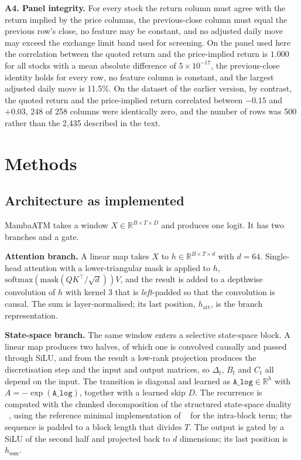 \documentclass[pdflatex,sn-mathphys-ay]{sn-jnl}
\theoremstyle{thmstyleone}%
\theoremstyle{thmstyletwo}%
\theoremstyle{thmstyletwo}%
\begin{document}
\textbf{A4. Panel integrity.} For every stock the return column must agree with the return implied
by the price columns, the previous-close column must equal the previous row's close, no feature may
be constant, and no adjusted daily move may exceed the exchange limit band used for screening. On
the panel used here the correlation between the quoted return and the price-implied return is
$1.000$ for all \nStocks{} stocks with a mean absolute difference of $5\times10^{-17}$, the
previous-close identity holds for every row, no feature column is constant, and the largest adjusted
daily move is 11.5\%. On the dataset of the earlier version, by contrast, the quoted return and the
price-implied return correlated between $-0.15$ and $+0.03$, 248 of 258 columns were identically
zero, and the number of rows was 500 rather than the 2{,}435 described in the text.

\section{Methods}\label{sec:method}

\subsection{Architecture as implemented}

MambaATM takes a window $X \in \mathbb{R}^{B \times T \times D}$ and produces one logit. It has two
branches and a gate.

\textbf{Attention branch.} A linear map takes $X$ to $h \in \mathbb{R}^{B \times T \times d}$ with
$d = 64$. Single-head attention with a lower-triangular mask is applied to $h$,
$\mathrm{softmax}(\mathrm{mask}(QK^\top/\sqrt{d}))V$, and the result is added to a depthwise
convolution of $h$ with kernel 3 that is \emph{left}-padded so that the convolution is causal. The
sum is layer-normalised; its last position, $h_{\text{att}}$, is the branch representation.

\textbf{State-space branch.} The same window enters a selective state-space block. A linear map
produces two halves, of which one is convolved causally and passed through SiLU, and from the result
a low-rank projection produces the discretisation step and the input and output matrices, so
$\Delta_t$, $B_t$ and $C_t$ all depend on the input. The transition is diagonal and learned as
$\mathtt{A\_log} \in \mathbb{R}^{h}$ with $A = -\exp(\mathtt{A\_log})$, together with a learned skip
$D$. The recurrence is computed with the chunked decomposition of the structured state-space duality
~\citep{Mamba2}, using the reference minimal implementation of ~\citet{Mamba2} for the intra-block
term; the sequence is padded to a block length that divides $T$. The output is gated by a SiLU of
the second half and projected back to $d$ dimensions; its last position is $h_{\text{ssm}}$.
\end{document}
